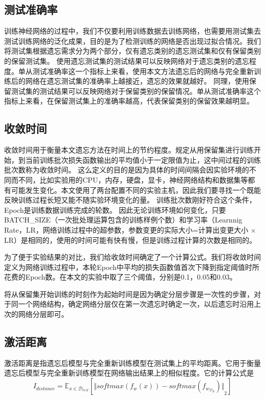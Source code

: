 \subsection{测试准确率}
训练神经网络的过程中，我们不仅要利用训练数据去训练网络，也需要用测试集去测试训练网络的泛化成果，目的是为了检测训练的网络是否出现过拟合情况。我们将测试集根据遗忘需求分为两个部分，仅有遗忘类别的遗忘测试集和仅有保留类别的保留测试集。
使用遗忘测试集的测试结果可以反映网络对于遗忘类别的遗忘程度。单从测试准确率这一个指标上来看，使用本文方法遗忘后的网络与完全重新训练后的网络在遗忘测试集的准确率上越接近，遗忘的效果就越好。
同理，使用保留测试集的测试结果可以反映网络对于保留类别的保留情况。单从测试准确率这个指标上来看，在保留测试集上的准确率越高，代表保留类别的保留效果越明显。

\subsection{收敛时间}
收敛时间用于衡量本文遗忘方法在时间上的节约程度。规定从用保留集进行训练开始，到当前训练批次损失函数输出的平均值小于一定限值为止，这中间过程的训练批次数称为收敛时间。
这么定义的目的是因为具体的时间间隔会因实验环境的不同而不同，比如实验用的CPU，内存，硬盘，显卡，神经网络结构和数据集等都有可能发生变化。本文使用了两台配置不同的实验主机，因此我们要寻找一个既能反映训练过程长短又能不随实验环境变化的量。
训练批次数刚好符合这个条件，Epoch是训练数据训练完成的轮数。
因此无论训练环境如何变化，只要BATCH\_SIZE（一次批处理运算包含的训练样例个数）和学习率（Learnnig Rate，LR，网络训练过程中的超参数，参数变更的实际大小=计算出变更大小 $\times$ LR）是相同的，使用的时间可能有快有慢，但是训练过程计算的次数是相同的。

为了便于实验结果的对比，我们给收敛时间确定了一个计算公式。我们将收敛时间定义为网络训练过程中，本轮Epoch中平均的损失函数值首次下降到指定阈值时所花费的Epoch数。在本文的实验中取了三个阈值，分别是0.1，0.05和0.03。

将从保留集开始训练的时刻作为起始时间是因为确定分层步骤是一次性的步骤，对于同一个网络结构，确定网络分层仅在第一次遗忘时确定一次，以后遗忘时沿用上次的网络分层即可。

\subsection{激活距离}
激活距离是指遗忘后模型与完全重新训练模型在测试集上的平均距离。它用于衡量遗忘后模型与完全重新训练模型在网络输出结果上的相似程度。它的计算公式是
\begin{equation}
I_{distance} = {\mathbb{E}}_{x\in {\mathcal{D}_{test}}}[{\Vert softmax(f_w(x)) - softmax(f_{w_{\mathcal{D}_R}}) \Vert}_2 ] \label{index_distance}
\end{equation}

